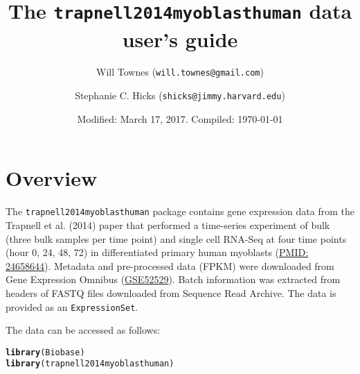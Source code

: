 \documentclass{article}\usepackage[]{graphicx}\usepackage[usenames,dvipsnames]{color}
\title{The \texttt{trapnell2014myoblasthuman} data user's guide}
\author{Will Townes (\texttt{will.townes@gmail.com}) \and 
Stephanie C. Hicks (\texttt{shicks@jimmy.harvard.edu}) }
\date{Modified: March 17, 2017.  Compiled: \today}
\makeatletter
\newcommand{\hlstd}[1]{\textcolor[rgb]{0.345,0.345,0.345}{#1}}%
\newcommand{\hlkwd}[1]{\textcolor[rgb]{0.737,0.353,0.396}{\textbf{#1}}}%
\newenvironment{kframe}{%
 \def\at@end@of@kframe{}%
 \ifinner\ifhmode%
  \def\at@end@of@kframe{\end{minipage}}%
  \begin{minipage}{\columnwidth}%
 \fi\fi%
 \def\FrameCommand##1{\hskip\@totalleftmargin \hskip-\fboxsep
 \colorbox{shadecolor}{##1}\hskip-\fboxsep
     \hskip-\linewidth \hskip-\@totalleftmargin \hskip\columnwidth}%
 \MakeFramed {\advance\hsize-\width
   \@totalleftmargin\z@ \linewidth\hsize
   \@setminipage}}%
 {\par\unskip\endMakeFramed%
 \at@end@of@kframe}
\newenvironment{knitrout}{}{} %
\makeatother
\begin{document}
\maketitle

\section{Overview}

The \texttt{trapnell2014myoblasthuman} package contains 
gene expression data from the Trapnell et al. (2014) paper
that performed a time-series experiment of bulk 
(three bulk samples per time point) and 
single cell RNA-Seq at four time points (hour 0, 24, 48, 72) in 
differentiated primary human myoblasts (\href{http://www.ncbi.nlm.nih.gov/pubmed/24658644}{PMID: 24658644}). 
Metadata and pre-processed data (FPKM) were downloaded
from Gene Expression Omnibus (\href{http://www.ncbi.nlm.nih.gov/geo/query/acc.cgi?acc=GSE52529}{GSE52529}). 
Batch information was extracted from headers 
of FASTQ files downloaded from Sequence Read Archive. 
The data is provided as an \texttt{ExpressionSet}.

The data can be accessed as follows:
\begin{knitrout}
\color{fgcolor}\begin{kframe}
\begin{alltt}
\hlkwd{library}\hlstd{(Biobase)}
\hlkwd{library}\hlstd{(trapnell2014myoblasthuman)}
\end{alltt}
\end{kframe}
\end{knitrout}
\end{document}
